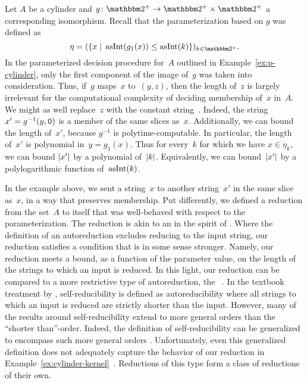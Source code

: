\begin{example}
\label{ex:cylinder-kernel}%
  Let $A$ be a \pdash{}cylinder and $g\colon \binary^+ \to \binary^+ \times \binary^+$ a corresponding isomorphism.
  Recall that the parameterization based on $g$ was defined as
  \begin{equation*}
    \eta \deq (\{x \st \asNat(g_1(x)) \le \asNat(k)\})_{k \in \binary^+}.
  \end{equation*}
  In the parameterized decision procedure for~$A$ outlined in Example~\ref{ex:p-cylinder}, only the first component of the image of~$g$ was taken into consideration.
  Thus, if~$g$ maps~$x$ to~$(y, z)$, then the length of~$z$ is largely irrelevant for the computational complexity of deciding membership of~$x$ in~$A$.
  We might as well replace~$z$ with the constant string~.
  Indeed, the string $x' = g^{-1}(y, \textnormal{\texttt{0}})$ is a member of the same slices as~$x$.
  Additionally, we can bound the length of~$x'$, because $g^{-1}$ is polytime-computable.
  In particular, the length of~$x'$ is polynomial in~$y = g_1(x)$.
  Thus for every~$k$ for which we have $x \in \eta_k$, we can bound ${\lvert x'\rvert}$ by a polynomial of~${\lvert k\rvert}$.
  Equivalently, we can bound~${\lvert x'\rvert}$ by a polylogarithmic function of~$\operatorname{asInt}(k)$.
\end{example}

In the example above, we sent a string~$x$ to another string~$x'$ in the same slice as~$x$, in a way that preserves membership.
Put differently, we defined a reduction from the set~$A$ to itself that was well-behaved with respect to the parameterization.
The reduction is akin to an  in the spirit of \textcite{trakhtenbrot1970autoreducibility}.
Where the definition of an autoreduction excludes reducing to the input string, our reduction satisfies a condition that is in some sense stronger.
Namely, our reduction meets a bound, as a function of the parameter value, on the length of the strings to which an input is reduced.
In this light, our reduction can be compared to a more restrictive type of autoreduction, the ~\parencite{meyer1979with}.
In the textbook treatment by \textcite[Section~4.5]{balcazar1995structural}, self-reducibility is defined as autoreducibility where all strings to which an input is reduced are strictly shorter than the input.
However, many of the results around self-reducibility extend to more general orders than the \enquote{shorter than}-order.
Indeed, the definition of self-reducibility can be generalized to encompass such more general orders \parencite{ko1983self,orponen1986optimal,buhrman1996p-selective}.
Unfortunately, even this generalized definition does not adequately capture the behavior of our reduction in Example~\ref{ex:cylinder-kernel}~\parencite{chen2011lower}.
Reductions of this type form a class of reductions of their own.

